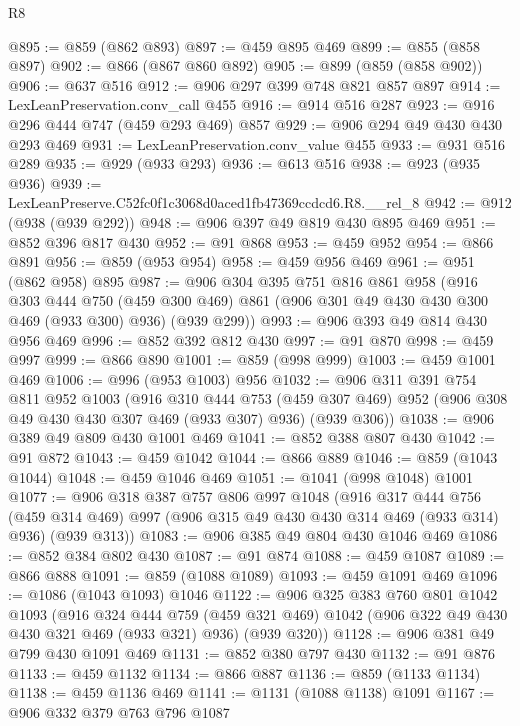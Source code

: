 \begin{lexlean}{R8}
\begin{coremodule}
@895 := @859 (@862 @893)
@897 := @459 @895 @469
@899 := @855 (@858 @897)
@902 := @866 (@867 @860 @892)
@905 := @899 (@859 (@858 @902))
@906 := @637 @516
@912 := @906 @297 @399 @748 @821 @857 @897
@914 := LexLeanPreservation.conv_call @455
@916 := @914 @516 @287
@923 := @916 @296 @444 @747 (@459 @293 @469) @857
@929 := @906 @294 @49 @430 @430 @293 @469
@931 := LexLeanPreservation.conv_value @455
@933 := @931 @516 @289
@935 := @929 (@933 @293)
@936 := @613 @516
@938 := @923 (@935 @936)
@939 := LexLeanPreserve.C52fc0f1c3068d0aced1fb47369ccdcd6.R8.__rel_8
@942 := @912 (@938 (@939 @292))
@948 := @906 @397 @49 @819 @430 @895 @469
@951 := @852 @396 @817 @430
@952 := @91 @868
@953 := @459 @952
@954 := @866 @891
@956 := @859 (@953 @954)
@958 := @459 @956 @469
@961 := @951 (@862 @958) @895
@987 := @906
    @304
    @395
    @751
    @816
    @861
    @958
    (@916
      @303
      @444
      @750
      (@459 @300 @469)
      @861
      (@906 @301 @49 @430 @430 @300 @469 (@933 @300) @936)
      (@939 @299))
@993 := @906 @393 @49 @814 @430 @956 @469
@996 := @852 @392 @812 @430
@997 := @91 @870
@998 := @459 @997
@999 := @866 @890
@1001 := @859 (@998 @999)
@1003 := @459 @1001 @469
@1006 := @996 (@953 @1003) @956
@1032 := @906
    @311
    @391
    @754
    @811
    @952
    @1003
    (@916
      @310
      @444
      @753
      (@459 @307 @469)
      @952
      (@906 @308 @49 @430 @430 @307 @469 (@933 @307) @936)
      (@939 @306))
@1038 := @906 @389 @49 @809 @430 @1001 @469
@1041 := @852 @388 @807 @430
@1042 := @91 @872
@1043 := @459 @1042
@1044 := @866 @889
@1046 := @859 (@1043 @1044)
@1048 := @459 @1046 @469
@1051 := @1041 (@998 @1048) @1001
@1077 := @906
    @318
    @387
    @757
    @806
    @997
    @1048
    (@916
      @317
      @444
      @756
      (@459 @314 @469)
      @997
      (@906 @315 @49 @430 @430 @314 @469 (@933 @314) @936)
      (@939 @313))
@1083 := @906 @385 @49 @804 @430 @1046 @469
@1086 := @852 @384 @802 @430
@1087 := @91 @874
@1088 := @459 @1087
@1089 := @866 @888
@1091 := @859 (@1088 @1089)
@1093 := @459 @1091 @469
@1096 := @1086 (@1043 @1093) @1046
@1122 := @906
    @325
    @383
    @760
    @801
    @1042
    @1093
    (@916
      @324
      @444
      @759
      (@459 @321 @469)
      @1042
      (@906 @322 @49 @430 @430 @321 @469 (@933 @321) @936)
      (@939 @320))
@1128 := @906 @381 @49 @799 @430 @1091 @469
@1131 := @852 @380 @797 @430
@1132 := @91 @876
@1133 := @459 @1132
@1134 := @866 @887
@1136 := @859 (@1133 @1134)
@1138 := @459 @1136 @469
@1141 := @1131 (@1088 @1138) @1091
@1167 := @906
    @332
    @379
    @763
    @796
    @1087

\end{coremodule}
\end{lexlean}
